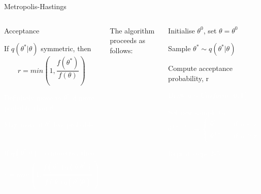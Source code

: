 \documentclass[compress]{beamer}
\begin{document}
\begin{frame}[label=sec-7-5]{Metropolis-Hastings}
    \begin{columns}[c] 
    \begin{block}{Acceptance}
        \begin{itemize}
            \item If $q(\theta^*|\theta)$ symmetric, then 
            $$ r = min \left( 1,\dfrac{f(\theta^*)}{f(\theta)} \right)$$ 
            \textcolor{white}{
                \item[\color{white}] Definitely move to $\theta^*$ if more probable than $\theta$ 
                \item[\color{white}] May move if $\theta^*$ less probable \\~\\
                \item[\color{white}] If $q(\theta^*|\theta)$ asymmetric, then $$ r = min \left( 1,\dfrac{f(\theta^*)q(\theta|\theta^*)}{f(\theta)q(\theta^*|\theta)} \right)$$
            }
        \end{itemize}
    \end{block}

    The algorithm proceeds as follows:\\
    \begin{enumerate}
        \item Initialise $\theta^{0}$, set $\theta = \theta^{0}$
        \item Sample $\theta^* \sim q(\theta^*|\theta)$
        \item Compute acceptance probability, r
        \textcolor{white}{
            \item[\color{white}] Draw $u \sim Uniform[0,1]$
            \item[\color{white}] Set new sample to 
            \[
               \theta^{(s+1)} = 
               \begin{cases}
                \theta^*, & \text{if } u < r\\
                \theta^{(s)}, & \text{if } u \geqslant r
            \end{cases}
        \]
        \item[\color{white}] Repeat steps 2-5
    }
\end{enumerate}
\end{columns}
\end{frame}
\end{document}
